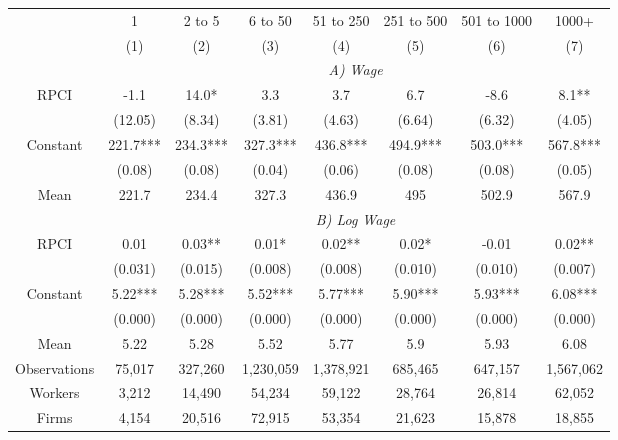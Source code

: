 \begin{tabular}{cccccccc}
\toprule
\toprule
      & 1     & 2 to 5 & 6 to 50 & 51 to 250 & 251 to 500 & 501 to 1000 & 1000+ \\
      & (1)   & (2)   & (3)   & (4)   & (5)   & (6)   & (7) \\
\cmidrule{2-8}      & \multicolumn{7}{c}{\textit{A) Wage}} \\
\midrule
RPCI  & -1.1  & 14.0* & 3.3   & 3.7   & 6.7   & -8.6  & 8.1** \\
      & (12.05) & (8.34) & (3.81) & (4.63) & (6.64) & (6.32) & (4.05) \\
Constant & 221.7*** & 234.3*** & 327.3*** & 436.8*** & 494.9*** & 503.0*** & 567.8*** \\
      & (0.08) & (0.08) & (0.04) & (0.06) & (0.08) & (0.08) & (0.05) \\
Mean  & 221.7 & 234.4 & 327.3 & 436.9 & 495   & 502.9 & 567.9 \\
\cmidrule{2-8}      & \multicolumn{7}{c}{\textit{B) Log Wage}} \\
\midrule
RPCI  & 0.01  & 0.03** & 0.01* & 0.02** & 0.02* & -0.01 & 0.02** \\
      & (0.031) & (0.015) & (0.008) & (0.008) & (0.010) & (0.010) & (0.007) \\
Constant & 5.22*** & 5.28*** & 5.52*** & 5.77*** & 5.90*** & 5.93*** & 6.08*** \\
      & (0.000) & (0.000) & (0.000) & (0.000) & (0.000) & (0.000) & (0.000) \\
Mean  & 5.22  & 5.28  & 5.52  & 5.77  & 5.9   & 5.93  & 6.08 \\
\midrule
Observations & 75,017 & 327,260 & 1,230,059 & 1,378,921 & 685,465 & 647,157 & 1,567,062 \\
Workers & 3,212 & 14,490 & 54,234 & 59,122 & 28,764 & 26,814 & 62,052 \\
Firms & 4,154 & 20,516 & 72,915 & 53,354 & 21,623 & 15,878 & 18,855 \\
\bottomrule
\bottomrule
\end{tabular}%
